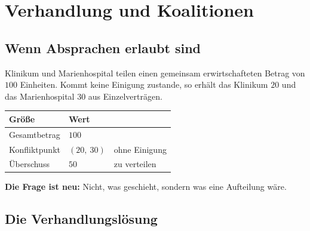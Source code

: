 \chapter{Verhandlung und Koalitionen}

\section{Wenn Absprachen erlaubt sind}

\begin{merksatz}
Klinikum und Marienhospital teilen einen gemeinsam erwirtschafteten Betrag von $100$ Einheiten. Kommt keine Einigung zustande, so erhält das Klinikum $20$ und das Marienhospital $30$ aus Einzelverträgen.

\begin{center}
{\small
\renewcommand{\arraystretch}{1.5}
\begin{tabular}{@{}P{2.4cm}P{2.2cm}P{3.0cm}@{}}
\toprule
\textbf{Größe} & \textbf{Wert} & \\
\midrule
Gesamtbetrag & $100$ & \\
Konfliktpunkt & $(20,\ 30)$ & ohne Einigung\\
Überschuss & $50$ & zu verteilen\\
\bottomrule
\end{tabular}}
\end{center}

\begin{center}
\begin{minipage}{0.9\textwidth}
\textbf{Die Frage ist neu:} Nicht, was geschieht, sondern was eine  Aufteilung wäre.
\end{minipage}
\end{center}

\begin{center}
\begin{minipage}{0.88\textwidth}
\end{minipage}
\end{center}
\end{merksatz}

\section{Die Verhandlungslösung}

